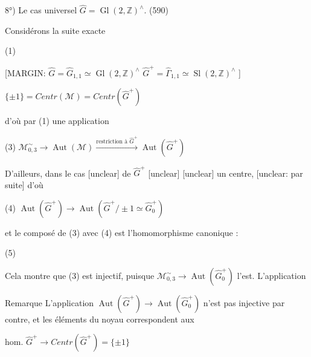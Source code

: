 \begin{enumerate}
\newpage



\newpage


8°) Le cas universel $\hat{G} = \operatorname{Gl}(2,\mathbb{Z})^\wedge$.  (590)

Considérons la suite exacte

(1) 

[MARGIN:
$\hat{G} = \hat{G}_{1,1} \simeq \operatorname{Gl}(2,\mathbb{Z})^\wedge$
$\hat{G}^+ = \hat{\Gamma}_{1,1} \simeq \operatorname{Sl}(2,\mathbb{Z})^\wedge$
]

$\{\pm 1\} = Centr(\mathcal{M}) = Centr(\hat{G}^+)$

d'où par (1) une application

(3) $\mathcal{M}_{0,3}^\sim \to \operatorname{Aut}(\mathcal{M}) \xrightarrow{\text{restriction à } \hat{G}^+} \operatorname{Aut}(\hat{G}^+)$

D'ailleurs, dans le cas [unclear] de $\hat{G}^+$ [unclear] 
[unclear] un centre, [unclear: par suite] d'où

(4) $\operatorname{Aut}(\hat{G}^+) \to \operatorname{Aut}(\hat{G}^+ / \pm 1 \simeq \hat{G}_0^+)$

et le composé de (3) avec (4) est l'homomorphisme canonique :

(5)

Cela montre que (3) est injectif, puisque $\mathcal{M}_{0,3}^\sim \to \operatorname{Aut}(\hat{G}_0^+)$ l'est. L'application

Remarque L'application $\operatorname{Aut}(\hat{G}^+) \to \operatorname{Aut}(\hat{G}_0^+)$ n'est pas injective par contre, et les éléments du noyau correspondent aux

hom. $\hat{G}^+ \to Centr(\hat{G}^+) = \{\pm 1\}$

\newpage


\end{enumerate}

